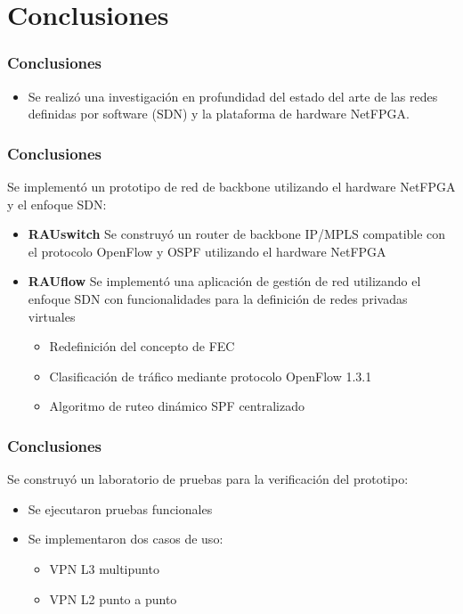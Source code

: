 \documentclass{beamer}
\begin{document}
\section{Conclusiones} 
\frame{\tableofcontents[currentsection]}

\begin{frame}
\frametitle{Conclusiones} 

\begin{itemize}
\item Se realiz\'o una investigaci\'on en profundidad del estado del arte de las redes definidas por software (SDN) y la plataforma de hardware NetFPGA.
\end{itemize}
\end{frame}

\begin{frame}
\frametitle{Conclusiones} 

Se implement\'o un prototipo de red de backbone utilizando el hardware NetFPGA y el enfoque SDN:

\pause
\begin{itemize}[<+->]
\item \textbf{RAUswitch} Se construy\'o un router de backbone IP/MPLS compatible con el protocolo OpenFlow y OSPF utilizando el hardware NetFPGA

\item \textbf{RAUflow} Se implement\'o una aplicaci\'on de gesti\'on de red utilizando el enfoque SDN con funcionalidades para la definici\'on de redes privadas virtuales

\begin{itemize}
\item Redefinici\'on del concepto de FEC
\item Clasificaci\'on de tr\'afico mediante protocolo OpenFlow 1.3.1
\item Algoritmo de ruteo din\'amico SPF centralizado
\end{itemize}
\end{itemize}

\end{frame}

\begin{frame}
\frametitle{Conclusiones} 

Se construy\'o un laboratorio de pruebas para la verificaci\'on del prototipo:

\pause
\begin{itemize}[<+->]
\item Se ejecutaron pruebas funcionales

\item Se implementaron dos casos de uso:
\begin{itemize}
\item VPN L3 multipunto
\item VPN L2 punto a punto
\end{itemize}

\end{itemize}

\end{frame}
\end{document}
